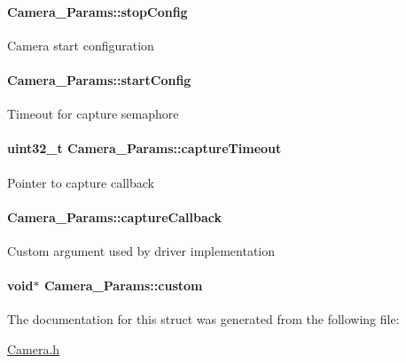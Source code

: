 \paragraph[{stop\+Config}]{ Camera\+\_\+\+Params\+::stop\+Config}\label{struct_camera___params_a89b5c7168ff120da5fc7461fb71499aa}
Camera start configuration 
\paragraph[{start\+Config}]{ Camera\+\_\+\+Params\+::start\+Config}\label{struct_camera___params_aa754cc494ff462b01a7ed647742b15af}
Timeout for capture semaphore 
\paragraph[{capture\+Timeout}]{\setlength{\rightskip}{0pt plus 5cm}uint32\+\_\+t Camera\+\_\+\+Params\+::capture\+Timeout}\label{struct_camera___params_a7a66a4013966579c58e2d02ad788d6ce}
Pointer to capture callback 
\paragraph[{capture\+Callback}]{ Camera\+\_\+\+Params\+::capture\+Callback}\label{struct_camera___params_a2bc1db1262e09919a7711301cd784fda}
Custom argument used by driver implementation 
\paragraph[{custom}]{\setlength{\rightskip}{0pt plus 5cm}void$\ast$ Camera\+\_\+\+Params\+::custom}\label{struct_camera___params_a35814b7c3aea7ecb153cbe05371cad27}


The documentation for this struct was generated from the following file\+:\begin{DoxyCompactItemize}
\item 
\hyperlink{_camera_8h}{Camera.\+h}\end{DoxyCompactItemize}
